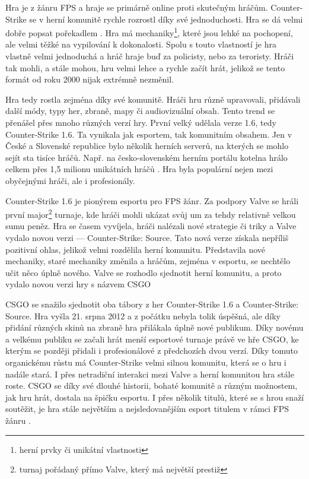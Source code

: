 Hra je z žánru \ac{FPS} a hraje se primárně online proti skutečným hráčům. Counter-Strike se v herní komunitě rychle rozrostl díky své jednoduchosti.
Hra se dá velmi dobře popsat pořekadlem . Hra má mechaniky\footnote{herní prvky či unikátní vlastnosti},
které jsou lehké na pochopení, ale velmi těžké na vypilování k dokonalosti. Spolu s touto vlastností je hra vlastně velmi jednoduchá a hráč hraje buď za policisty, nebo za
teroristy. Hráči tak mohli, a stále mohou, hru velmi lehce a rychle začít hrát, jelikož se tento formát od roku 2000 nijak extrémně nezměnil.

Hra tedy rostla zejména díky své komunitě. Hráči hru různě upravovali, přidávali další módy, typy her, zbraně, mapy či audiovizuální obsah. Tento trend se přenášel přes
mnoho různých verzí hry. První velký  udělala verze 1.6, tedy Counter-Strike 1.6. Ta vynikala jak esportem, tak komunitním obsahem. Jen v České a
Slovenské republice bylo několik herních serverů, na kterých se mohlo sejít sta tisíce hráčů. Např. na česko-slovenském herním portálu kotelna hrálo celkem přes
1,5 milionu unikátních hráčů \cite{csko2021}. Hra byla populární nejen mezi obyčejnými hráči, ale i profesionály.

Counter-Strike 1.6 je pionýrem esportu pro \ac{FPS} žánr. Za podpory Valve se hráli první major\footnote{turnaj pořádaný přímo Valve, který má největší prestiž} turnaje,
kde hráči mohli ukázat svůj um za tehdy relativně velkou sumu peněz. Hra se časem vyvíjela, hráči nalézali nové strategie či triky a Valve vydalo novou verzi ---  Counter-Strike:
Source. Tato nová verze získala nepříliš pozitivní ohlas, jelikož velmi rozdělila herní komunitu. Představila nové mechaniky, staré mechaniky změnila a hráčům, zejména v esportu,
se nechtělo učit něco úplně nového. Valve se rozhodlo sjednotit herní komunitu, a proto vydalo novou verzi hry
s názvem \ac{CSGO}

\ac{CSGO} se snažilo sjednotit oba tábory z her 
Counter-Strike 1.6 a Counter-Strike: Source. Hra vyšla 21. srpna 2012 a z počátku nebyla tolik úspěšná, ale díky přidání různých
skinů \cite{Valve2013} na zbraně hra přilákala úplně nové publikum. Díky novému a velkému publiku se začali hrát menší esportové turnaje právě ve hře \ac{CSGO}, ke kterým se
později přidali i profesionálové z předchozích dvou verzí. Díky tomuto organickému růstu má Counter-Strike velmi silnou komunitu, která se o hru i nadále stará. I přes
netradiční interakci mezi Valve a herní komunitou hra stále roste. \ac{CSGO} se díky své dlouhé historii, bohaté komunitě a různým možnostem, jak hru hrát, dostala na špičku
esportu. I přes několik titulů, které se s hrou snaží soutěžit, je hra stále největším a nejsledovanějším esport titulem v rámci \ac{FPS} žánru \cite{Henningson2020}.

